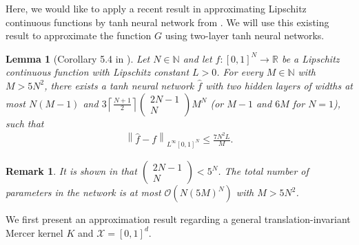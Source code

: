 \documentclass{article}
\def\NN{\mathbb N}
\def\RR{\mathbb R}
\numberwithin{equation}{section}
\newtheorem{lemma}[theorem]{Lemma}
\newtheorem{remark}[theorem]{Remark}
\begin{document}
Here, we would like to apply a recent result in approximating  Lipschitz continuous functions by tanh neural network from \citep{de2021approximation}. 
We will use this existing result to approximate the function $G$ using two-layer tanh neural networks. 

\begin{lemma}[Corollary 5.4 in \citep{de2021approximation}]\label{lemma:tim}
Let $N\in \NN$ and let $f:[0,1]^N \rightarrow \RR$ be a Lipschitz continuous function with Lipschitz constant $L>0$. For every $M\in \NN$ with $M>5N^2$, there exists a tanh neural network $\widehat{f}$ with two hidden layers of widths at most $N(M-1)$ and $3\left\lceil \frac{N+1}{2} \right\rceil    
\begin{pmatrix}
        2N-1\\
        N
    \end{pmatrix}M^N$ (or $M-1$ and $6M$ for $N=1$), such that 
    \begin{eqnarray*}
        \left\|\widehat{f}-f\right\|_{L^\infty [0,1]^N} \leq \frac{7N^2L}{M}. 
    \end{eqnarray*}
\end{lemma}
\begin{remark}
It is shown in \citep[Lemma 2.1]{de2021approximation} that $ \begin{pmatrix}
        2N-1\\
        N
    \end{pmatrix}< 5^N$. The total number of parameters in the network is at most $\mathcal{O}(N(5M)^N)$ with $M>5N^2$. 
\end{remark}


We first present an approximation result regarding a general translation-invariant Mercer kernel $K$ and $\mathcal{X}=[0,1]^d$.
\end{document}
